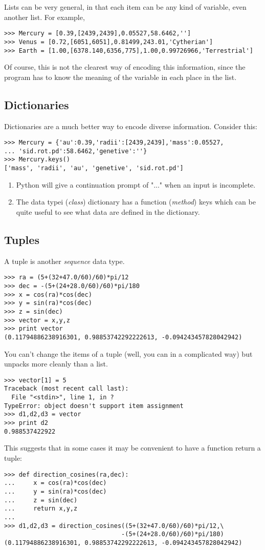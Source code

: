 \documentclass{article}
\begin{document}
Lists can be very general, in that each item can be any kind of variable,
even another list. For example,
\begin{verbatim}
>>> Mercury = [0.39,[2439,2439],0.05527,58.6462,'']
>>> Venus = [0.72,[6051,6051],0.81499,243.01,'Cytherian']
>>> Earth = [1.00,[6378.140,6356,775],1.00,0.99726966,'Terrestrial']
\end{verbatim}
Of course, this is not the clearest way of encoding this information, since the
program has to know the meaning of the variable in each place in the list.

\subsection{Dictionaries}

Dictionaries are a much better way to encode diverse information. Consider
this:
\begin{verbatim}
>>> Mercury = {'au':0.39,'radii':[2439,2439],'mass':0.05527, 
... 'sid.rot.pd':58.6462,'genetive':''}
>>> Mercury.keys()
['mass', 'radii', 'au', 'genetive', 'sid.rot.pd']
\end{verbatim}

\begin{enumerate}
\item Python will give a continuation prompt of "..." when an input is
incomplete.
\item The data typei ({\itshape class}) {\ttfamily dictionary} has a
function ({\itshape method}) {\ttfamily keys}
which can be quite useful to see what data are defined in the dictionary.
\end{enumerate}

\subsection{Tuples}

A tuple is another {\itshape sequence} data type.
\begin{verbatim}
>>> ra = (5+(32+47.0/60)/60)*pi/12
>>> dec = -(5+(24+28.0/60)/60)*pi/180
>>> x = cos(ra)*cos(dec)
>>> y = sin(ra)*cos(dec)
>>> z = sin(dec)
>>> vector = x,y,z
>>> print vector
(0.11794886238916301, 0.98853742292222613, -0.094243457828042942)
\end{verbatim}
You can't change the items of a tuple (well, you can in a complicated way) but
unpacks more cleanly than a list.
\begin{verbatim}
>>> vector[1] = 5
Traceback (most recent call last):
  File "<stdin>", line 1, in ?
TypeError: object doesn't support item assignment
>>> d1,d2,d3 = vector
>>> print d2
0.988537422922
\end{verbatim} 
This suggests that in some cases it may be
convenient to have a function return a tuple:
\begin{verbatim}
>>> def direction_cosines(ra,dec):
...     x = cos(ra)*cos(dec)
...     y = sin(ra)*cos(dec)
...     z = sin(dec)
...     return x,y,z
...
>>> d1,d2,d3 = direction_cosines((5+(32+47.0/60)/60)*pi/12,\
                                -(5+(24+28.0/60)/60)*pi/180)
(0.11794886238916301, 0.98853742292222613, -0.094243457828042942)
\end{verbatim}
\end{document}
